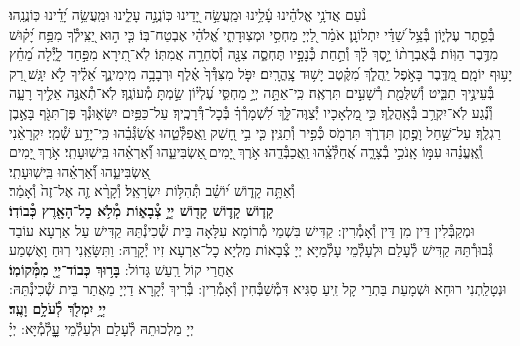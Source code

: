 \documentclass[twoside, openany, parskip=half, 11pt]{book}
\begin{document}
\begin{sometimes}


\halfkaddish


\label{vihi noam}

נֹ֨עַם אֲדֹנָ֥י אֱלֹהֵ֗ינוּ עָ֫לֵ֥ינוּ וּמַֽעֲשֵׂ֣ה יָ֭דֵינוּ כּֽוֹנֲנָ֣ה עָלֵ֑ינוּ וּמַֽעֲשֵׂ֥ה יָ֝דֵ֗ינוּ כּֽוֹנֲנֵֽהוּ׃\\
בְּ֯סֵ֣תֶר עֶלְי֑וֹן בְּ֯צֵ֥ל שַׁ֝דַּ֗י יִתְלוֹנָֽן׃
אֹמַ֗ר לַ֭יְיָ מַחְסִ֣י וּמְצֽוּדָתִ֑י אֱ֝לֹהַ֗י אֶבְטַח־בּֽוֹ׃
כִּ֤י ה֣וּא יַ֭צִּֽילְ֯ךָ מִפַּ֥ח יָ֝ק֗וּשׁ מִדֶּ֥בֶר הַוּֽוֹת׃
בְּ֯אֶבְרָת֨וֹ יָ֣סֶךְ לָ֗ךְ וְ֯תַ֣חַת כְּ֯נָפָ֣יו תֶּחְסֶ֑ה צִנָּ֖ה וְ֯סֹֽחֵרָ֣ה אֲמִתּֽוֹ׃
לֹֽא־תִ֭ירָא מִפַּ֣חַד לָ֑יְ֯לָה מֵ֝חֵ֗ץ יָע֥וּף יוֹמָֽם׃
מִ֭דֶּֽבֶר בָּאֹ֣פֶל יַֽהֲלֹ֑ךְ מִ֝קֶּ֗טֶב יָשׁ֥וּד צׇֽהֳרָֽיִם׃
יִפֹּ֤ל מִצִּדְּ֯ךָ֙ אֶ֗לֶף וּרְבָבָ֥ה מִֽימִינֶ֑ךָ אֵ֝לֶ֗יךָ לֹ֣א יִגָּֽשׁ׃
רַ֭ק בְּ֯עֵינֶ֣יךָ תַבִּ֑יט וְ֯שִׁלֻּמַ֖ת רְ֯שָׁעִ֣ים תִּרְאֶֽה׃
כִּֽי־אַתָּ֣ה יְיָ֣ מַחְסִּ֑י עֶ֝לְי֗וֹן שַׂ֣מְתָּ מְ֯עוֹנֶֽךָ׃
לֹֽא־תְ֯אֻנֶּ֣ה אֵלֶ֣יךָ רָעָ֑ה וְ֯נֶ֗֝גַע לֹֽא־יִקְרַ֥ב בְּ֯אׇֽהֳלֶֽךָ׃
כִּ֣י מַ֭לְאָכָיו יְ֯צַוֶּה־לָּ֑ךְ לִ֝שְׁמָרְ֯ךָ֗ בְּ֯כׇל־דְּ֯רָכֶֽיךָ׃
עַל־כַּפַּ֥יִם יִשָּׂא֑וּנְ֯ךָ פֶּן־תִּגֹּ֖ף בָּאֶ֣בֶן רַגְלֶֽךָ׃
עַל־שַׁ֣חַל וָפֶ֣תֶן תִּדְרֹ֑ךְ תִּרְמֹ֖ס כְּ֯פִ֣יר וְ֯תַנִּֽין׃
כִּ֤י בִ֣י חָ֭שַׁק וַֽאֲפַלְּ֯טֵ֑הוּ אֲשַׂ֝גְּ֯בֵ֗הוּ כִּֽי־יָדַ֥ע שְׁ֯מִֽי׃
יִקְרָאֵ֨נִי וְֽ֯אֶֽעֱנֵ֗הוּ עִמּ֣וֹ אָֽנֹכִ֣י בְ֯צָרָ֑ה אֲ֝חַלְּ֯צֵֽ֗הוּ וַֽאֲכַבְּ֯דֵֽהוּ׃
אֹ֣רֶךְ יָ֭מִים ֖אַשְׂבִּיעֵ֑הוּ וְ֝֯אַרְאֵ֗הוּ בִּֽישֽׁוּעָתִֽי׃
אֹ֣רֶךְ יָ֭מִים ֖אַשְׂבִּיעֵ֑הוּ וְ֝֯אַרְאֵ֗הוּ בִּֽישֽׁוּעָתִֽי׃\\
\label{v ata kadosh}
וְ֯אַתָּ֥ה
%
קָד֑וֹשׁ י֝וֹשֵׁ֗ב תְּ֯הִלּ֥וֹת יִשְׂרָאֵֽל׃
%
וְ֯קָרָ֨א זֶ֤ה אֶל־זֶה֙ וְ֯אָמַ֔ר׃\\
\textbf{קָד֧וֹשׁ קָד֛וֹשׁ קָד֖וֹשׁ יְיָ֣ צְ֯בָא֑וֹת מְ֯לֹ֥א כׇל־הָאָ֖רֶץ כְּ֯בוֹדֽוֹ׃}\\
וּמְקַבְּ֯לִין דֵּין מִן דֵּין וְ֯אָמְ֯רִין: קַדִּישׁ בִּשְׁמֵי מְ֯רוֹמָא עִלָּאָה בֵּית שְׁ֯כִינְ֯תֵּהּ קַדִּישׁ עַל אַרְעָא עוֹבַד גְּ֯בוּרְ֯תֵּהּ קַדִּישׁ לְ֯עָלַם וּלְעָלְ֯מֵי עָלְ֯מַיָּא יְיָ צְ֯בָאוֹת מַלְיָא כׇל־אַרְעָא זִיו יְ֯קָרֵהּ: וַתִּשָּׂאֵֽנִי רֽוּחַ וָאֶשְׁמַע אַחֲרַי קוֹל רַֽעַשׁ גָּדוֹל:
\textbf{בָּר֥וּךְ כְּבוֹד־יְיָ֖ מִמְּ֯קוֹמֽוֹ׃} \\
וּנְטָלַֽתְנִי רוּחָא וּשְׁמָעֵת בַּתְרַי קָל זִֽיעַ סַגִּיא דִּמְ֯שַׁבְּ֯חִין וְ֯אָמְ֯רִין: בְּ֯רִיךְ יְ֯קָרָא דַיְיָ מֵאֲתַר בֵּית שְׁ֯כִינְ֯תֵּהּ:
\textbf{יְיָ֥ יִמְלֹ֖ךְ לְ֯עֹלָ֥ם וָעֶֽד׃} \\
יְיָ מַלְכוּתֵהּ לְ֯עָלַם וּלְעַלְ֯מֵי עׇׇׇׇׇלְ֯מְ֯יָּא: יְיָ֗

\end{sometimes}
\end{document}
